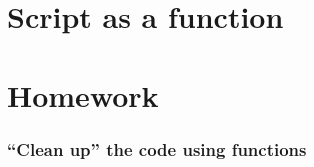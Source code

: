 \documentclass[aspectratio=169]{beamer}
\newcommand{\style}[1]{\ttfamily#1}
\begin{document}
\section{Script as a function}

\begin{frame}[fragile]
  
  \vspace{1.5cm}
  
\end{frame}

\section{Homework}

\begin{frame}[fragile]
  \frametitle{``Clean up'' the code using functions}
  
\end{frame}
\end{document}
